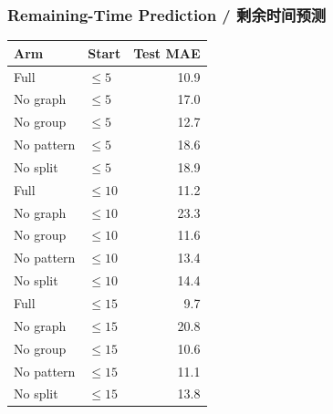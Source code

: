 \documentclass[10pt,a4paper]{article}
\begin{document}
\subsubsection{Remaining-Time Prediction / 剩余时间预测}
\begin{center}
\scriptsize
\begin{tabular}{llr}
\toprule
Arm & Start & Test MAE \\
\midrule
Full       & $\leq5$ & 10.9 \\
No graph   & $\leq5$ & 17.0 \\
No group   & $\leq5$ & 12.7 \\
No pattern & $\leq5$ & 18.6 \\
No split   & $\leq5$ & 18.9 \\
\midrule
Full       & $\leq10$ & 11.2 \\
No graph   & $\leq10$ & 23.3 \\
No group   & $\leq10$ & 11.6 \\
No pattern & $\leq10$ & 13.4 \\
No split   & $\leq10$ & 14.4 \\
\midrule
Full       & $\leq15$ & 9.7 \\
No graph   & $\leq15$ & 20.8 \\
No group   & $\leq15$ & 10.6 \\
No pattern & $\leq15$ & 11.1 \\
No split   & $\leq15$ & 13.8 \\
\bottomrule
\end{tabular}
\end{center}
\end{document}
